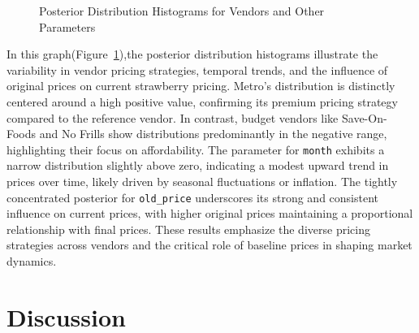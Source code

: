 \documentclass[
  letterpaper,
  DIV=11,
  numbers=noendperiod]{scrartcl}
\begin{document}
\begin{figure}


\caption{\label{fig-posterior}Posterior Distribution Histograms for
Vendors and Other Parameters}

\end{figure}%

In this graph(Figure~\ref{fig-posterior}),the posterior distribution
histograms illustrate the variability in vendor pricing strategies,
temporal trends, and the influence of original prices on current
strawberry pricing. Metro's distribution is distinctly centered around a
high positive value, confirming its premium pricing strategy compared to
the reference vendor. In contrast, budget vendors like Save-On-Foods and
No Frills show distributions predominantly in the negative range,
highlighting their focus on affordability. The parameter for
\texttt{month} exhibits a narrow distribution slightly above zero,
indicating a modest upward trend in prices over time, likely driven by
seasonal fluctuations or inflation. The tightly concentrated posterior
for \texttt{old\_price} underscores its strong and consistent influence
on current prices, with higher original prices maintaining a
proportional relationship with final prices. These results emphasize the
diverse pricing strategies across vendors and the critical role of
baseline prices in shaping market dynamics.

\section{Discussion}\label{sec-discussion}
\end{document}
